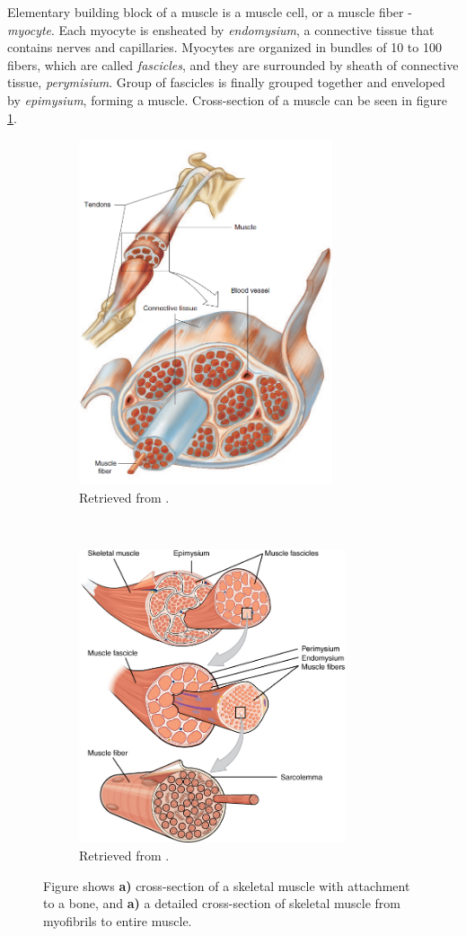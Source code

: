 Elementary building block of a muscle is a muscle cell, or a muscle fiber - \emph{myocyte}. Each myocyte is ensheated by \emph{endomysium}, a connective tissue that contains nerves and capillaries. Myocytes are organized in bundles of 10 to 100 fibers, which are called \emph{fascicles}, and they are surrounded by sheath of connective tissue, \emph{perymisium}. Group of fascicles is finally grouped together and enveloped by \emph{epimysium}, forming a muscle. Cross-section of a muscle can be seen in figure \ref{fig:muscle}.
\begin{figure}[t!]
    \centering
    \begin{subfigure}[t]{0.49\textwidth}
        \centering
        \includegraphics[height=4in]{Images/introduction/muscle.png}
        \caption{Retrieved from \citet{Widmaier2014}.}
    \end{subfigure}%
    ~ 
    \begin{subfigure}[t]{0.49\textwidth}
        \centering
        \includegraphics[height=3.4in]{Images/introduction/Muscle_Fibers.png}
        \caption{Retrieved from \citet{OpenStax2013}.}
    \end{subfigure}
    \caption{Figure shows \textbf{a)} cross-section of a skeletal muscle with attachment to a bone, and \textbf{a)} a detailed cross-section of skeletal muscle from myofibrils to entire muscle.}
\label{fig:muscle}
\end{figure}
